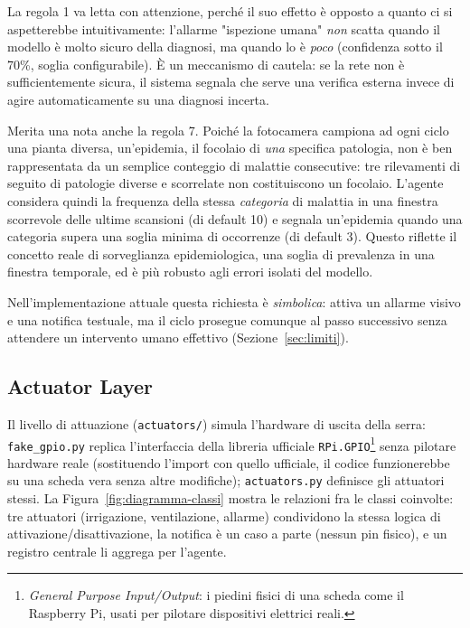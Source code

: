 La regola 1 va letta con attenzione, perché il suo effetto è opposto a
quanto ci si aspetterebbe intuitivamente: l'allarme "ispezione umana"
\emph{non} scatta quando il modello è molto sicuro della diagnosi, ma
quando lo è \emph{poco} (confidenza sotto il 70\%, soglia configurabile).
È un meccanismo di cautela: se la rete non è sufficientemente sicura, il
sistema segnala che serve una verifica esterna invece di agire
automaticamente su una diagnosi incerta.

Merita una nota anche la regola 7. Poiché la fotocamera campiona ad ogni
ciclo una pianta diversa, un'epidemia, il focolaio di \emph{una} specifica
patologia, non è ben rappresentata da un semplice conteggio di malattie
consecutive: tre rilevamenti di seguito di patologie diverse e scorrelate
non costituiscono un focolaio. L'agente considera quindi la frequenza della
stessa \emph{categoria} di malattia in una finestra scorrevole delle ultime
scansioni (di default 10) e segnala un'epidemia quando una categoria supera
una soglia minima di occorrenze (di default 3). Questo riflette il concetto
reale di sorveglianza epidemiologica, una soglia di prevalenza in una
finestra temporale, ed è più robusto agli errori isolati del modello.

\begin{warnbox}
Nell'implementazione attuale questa richiesta è \emph{simbolica}: attiva un
allarme visivo e una notifica testuale, ma il ciclo prosegue comunque al
passo successivo senza attendere un intervento umano effettivo
(Sezione~\ref{sec:limiti}).
\end{warnbox}

\subsection{Actuator Layer}

Il livello di attuazione (\texttt{actuators/}) simula l'hardware di uscita
della serra: \texttt{fake\_gpio.py} replica l'interfaccia della libreria
ufficiale \texttt{RPi.GPIO}\footnote{\emph{General Purpose Input/Output}: i
piedini fisici di una scheda come il Raspberry Pi, usati per pilotare
dispositivi elettrici reali.} senza pilotare hardware reale (sostituendo
l'import con quello ufficiale, il codice funzionerebbe su una scheda vera
senza altre modifiche); \texttt{actuators.py} definisce gli attuatori stessi.
La Figura~\ref{fig:diagramma-classi} mostra le relazioni fra le classi
coinvolte: tre attuatori (irrigazione, ventilazione, allarme) condividono
la stessa logica di attivazione/disattivazione, la notifica è un caso a
parte (nessun pin fisico), e un registro centrale li aggrega per l'agente.

